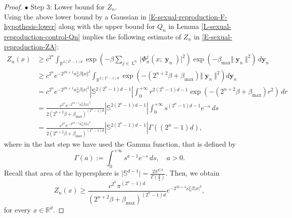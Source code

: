 \documentclass[reqno]{amsart}
\DeclareMathOperator{\Leaves}{\mathsf{L}}
\DeclareMathOperator{\by}{\mathbf{y}}
\numberwithin{equation}{section}
\begin{document}
{\begin{proof}
\medskip

$\bullet$ {\sc Step 3}: Lower bound for $Z_n$.\\
Using the above lower bound by a Gaussian in \eqref{E-sexual-reproduction-F-hypothesis-lower} along with the upper bound for $Q_n$ in Lemma \ref{L-sexual-reproduction-control-Qn} implies the following estimate of $Z_n$ in \eqref{E-sexual-reproduction-ZA}:
\begin{align*}
Z_n(x)&\geq c^{2^n}\int_{\mathbb{R}^{2(2^n-1)d}}\exp\left(-\beta\sum_{j\in \Leaves^n} \vert \Phi^j_n(x;\by_n)\vert^2\right)\exp(-\beta_{\max} \Vert \by_n\Vert^2)\,d\mathbf{y}_n\\
&\geq c^{2^n} e^{-2^{2n+1}\kappa_n^2\beta \Vert x\Vert^2}\int_{\mathbb{R}^{2(2^n-1)d}} \exp\left(-(2^{n+2}\beta +\beta_{\max})\Vert \by_n\Vert^2\right)d\mathbf{y}_n\\
&=c^{2^n} e^{-2^{2n+1}\kappa_n^2\beta \vert x\vert^2} \left\vert \mathbb{S}^{2(2^n-1)d-1}\right\vert\int_0^{+\infty}r^{2(2^n-1)d-1} \exp\left(-(2^{n+2}\beta +\beta_{\max}) r^2\right)\,dr\\
&=\frac{c^{2^n} e^{-2^{2n+1}\kappa_n^2\beta \vert x\vert^2} }{2(2^{n+2}\beta+\beta_{\max})^{(2^n-1)d}} \left\vert \mathbb{S}^{2(2^n-1)d-1}\right\vert\int_0^{+\infty} s^{(2^n-1)d-1}e^{-s}\,ds\\
&=\frac{c^{2^n} e^{-2^{2n+1}\kappa_n^2\beta \vert x\vert^2} }{2(2^{n+2}\beta+\beta_{\max})^{(2^n-1)d}} \left\vert \mathbb{S}^{2(2^n-1)d-1}\right\vert\Gamma((2^n-1)d),
\end{align*}
where in the last step we have used the Gamma function, that is defined by
$$\Gamma(a):=\int_0^{+\infty}s^{a-1}e^{-s}\,ds,\quad a>0.$$
Recall that area of the hypersphere is $\vert \mathbb{S}^{d-1}\vert=\frac{2\pi^{d/2}}{\Gamma\left(\frac{d}{2}\right)}$. Then, we obtain
\begin{equation}\label{E-sexual-reproduction-ZA-lower-bound}
Z_n(x)\geq \frac{c^{2^n}\pi^{(2^n-1)d}}{(2^{n+2}\beta+\beta_{\max})^{(2^n-1)d}} e^{-2^{2n+1}\kappa_n^2\beta \vert x\vert^2},
\end{equation}
for every $x\in \mathbb{R}^d$.

\medskip


\end{proof}}
\end{document}
